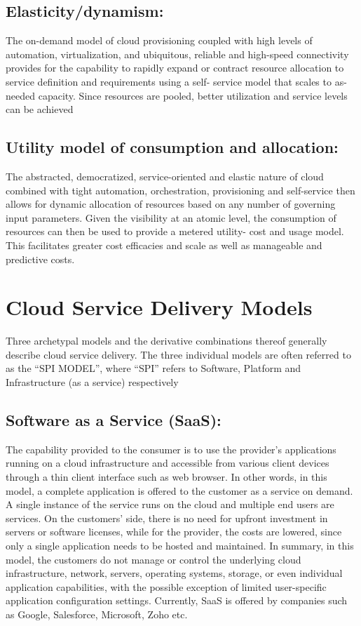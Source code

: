 \documentclass[11pt,a4paper]{report}
\begin{document}
\subsection{Elasticity/dynamism:}
The on-demand model of cloud provisioning coupled with high levels of
automation, virtualization, and ubiquitous, reliable and high-speed connectivity provides for the capability
to rapidly expand or contract resource allocation to service definition and requirements using a self-
service model that scales to as-needed capacity. Since resources are pooled, better utilization and service
levels can be achieved
\subsection{Utility model of consumption and allocation:}
The abstracted, democratized, service-oriented and elastic
nature of cloud combined with tight automation, orchestration, provisioning and self-service then allows
for dynamic allocation of resources based on any number of governing input parameters. Given the
visibility at an atomic level, the consumption of resources can then be used to provide a metered utility-
cost and usage model. This facilitates greater cost efficacies and scale as well as manageable and
predictive costs.
\section{Cloud Service Delivery Models}
Three archetypal models and the derivative combinations thereof generally describe cloud service
delivery. The three individual models are often referred to as the “SPI MODEL”, where “SPI” refers to
Software, Platform and Infrastructure (as a service) respectively
\subsection{Software as a Service (SaaS):}
The capability provided to the consumer is to use the provider’s
applications running on a cloud infrastructure and accessible from various client devices through a thin
client interface such as web browser. In other words, in this model, a complete application is offered to
the customer as a service on demand. A single instance of the service runs on the cloud and multiple end
users are services. On the customers’ side, there is no need for upfront investment in servers or software
licenses, while for the provider, the costs are lowered, since only a single application needs to be hosted
and maintained. In summary, in this model, the customers do not manage or control the underlying cloud
infrastructure, network, servers, operating systems, storage, or even individual application capabilities,
with the possible exception of limited user-specific application configuration settings. Currently, SaaS is
offered by companies such as Google, Salesforce, Microsoft, Zoho etc.
\end{document}
